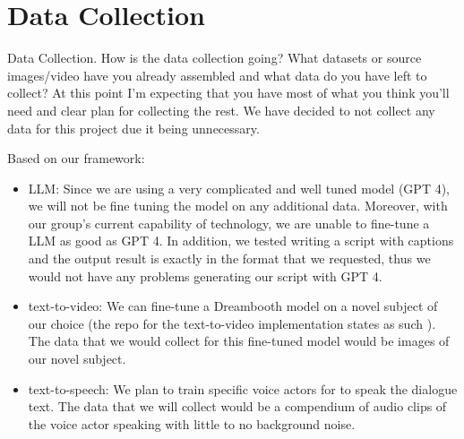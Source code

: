\documentclass[conference]{IEEEtran}
\begin{document}
\section{Data Collection}

\begin{tcolorbox}
Data Collection. How is the data collection going? What datasets or source images/video have you already assembled and what data do you have left to collect? At this point I’m expecting that you have most of what you think you’ll need and clear plan for collecting the rest.
We have decided to not collect any data for this project due it being unnecessary.
\end{tcolorbox}

Based on our framework:
\begin{itemize}
    \item LLM: Since we are using a very complicated and well tuned model (GPT 4), we will not be fine tuning the model on any additional data. Moreover, with our group's current capability of technology, we are unable to fine-tune a LLM as good as GPT 4. In addition, we tested writing a script with captions and the output result is exactly in the format that we requested, thus we would not have any problems generating our script with GPT 4.
    \item text-to-video: We can fine-tune a Dreambooth \cite{dreambooth} model on a novel subject of our choice 
    (the repo for the text-to-video implementation states as such \cite{text2vid-gh}). The data that we would
    collect for this fine-tuned model would be images of our novel subject.
    \item text-to-speech: We plan to train specific voice actors for to speak the dialogue text.
    The data that we will collect would be a compendium of audio clips of the voice actor speaking
    with little to no background noise.
\end{itemize}
\end{document}
